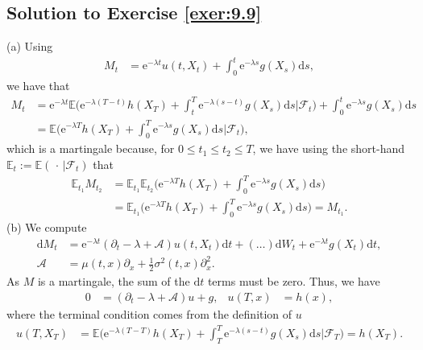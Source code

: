 \documentclass[12pt]{book}
\numberwithin{equation}{chapter}
\theoremstyle{plain}
\numberwithin{theorem}{section}
\theoremstyle{definition}
\numberwithin{exercise}{chapter}
\newcommand{\<}{\langle}
\renewcommand{\>}{\rangle}
\renewcommand{\(}{\left(}
\renewcommand{\)}{\right)}
\renewcommand{\[}{\left[}
\renewcommand{\]}{\right]}
\newcommand\Eb{\mathds{E}}
\newcommand\Ac{\mathscr{A}}
\newcommand\Fc{\mathscr{F}}
\newcommand\sig{\sigma}
\newcommand\lam{\lambda}
\renewcommand\d{\partial}
\newcommand\dd{\mathrm{d}}
\newcommand\ee{\mathrm{e}}
\begin{document}
\subsection*{Solution to Exercise \ref{exer:9.9}}
(a) Using
\begin{align}
M_t
	&=	\ee^{- \lam t} u(t,X_t) + \int_0^t \ee^{- \lam s} g(X_s) \dd s , 
\end{align}
we have that
\begin{align}
M_t
	&=	\ee^{- \lam t} \Eb \Big( \ee^{- \lam (T-t)} h(X_T) + \int_t^T \ee^{- \lam (s-t)} g(X_s) \dd s \Big| \Fc_t \Big) + \int_0^t \ee^{- \lam s} g(X_s) \dd s \\
	&=	\Eb \Big( \ee^{- \lam T} h(X_T) + \int_0^T \ee^{- \lam s} g(X_s) \dd s \Big| \Fc_t \Big) ,
\end{align}
which is a martingale because, for $0 \leq t_1 \leq t_2 \leq T$, we have using the short-hand $\Eb_t := \Eb( \, \cdot \, | \Fc_t )$ that
\begin{align}
\Eb_{t_1} M_{t_2}
	&=	\Eb_{t_1} \Eb_{t_2} \Big( \ee^{- \lam T} h(X_T) + \int_0^T \ee^{- \lam s} g(X_s) \dd s \Big) \\
	&=	\Eb_{t_1} \Big( \ee^{- \lam T} h(X_T) + \int_0^T \ee^{- \lam s} g(X_s) \dd s \Big) 
	=		M_{t_1} .
\end{align}
(b) We compute
\begin{align}
\dd M_t
	&=	\ee^{- \lam t} ( \d_t - \lam + \Ac) u(t,X_t) \dd t + ( \ldots ) \dd W_t + \ee^{- \lam t} g(X_t) \dd t , \\
\Ac
	&=	\mu(t,x) \d_x + \tfrac{1}{2} \sig^2(t,x) \d_x^2 .
\end{align}
As $M$ is a martingale, the sum of the $\dd t$ terms must be zero.  Thus, we have
\begin{align}
0
	&=	( \d_t - \lam + \Ac) u + g , &
u(T,x) 
	&=	h(x) ,
\end{align}
where the terminal condition comes from the definition of $u$
\begin{align}
u(T,X_T)
	&=	\Eb \Big( \ee^{- \lam (T-T)} h(X_T) + \int_T^T \ee^{- \lam (s-t)} g(X_s) \dd s \Big| \Fc_T \Big)
	=		h(X_T) .
\end{align}
\end{document}
